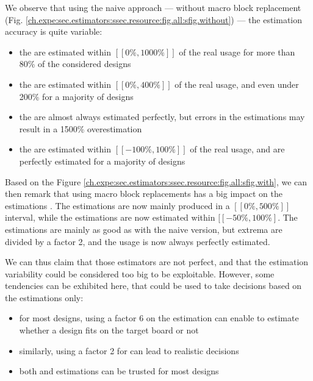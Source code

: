         We observe that using the naive approach --- \ie without macro block replacement (Fig. \ref{ch.expe:sec.estimators:ssec.resource:fig.all:sfig.without}) --- the estimation accuracy is quite variable:
        \begin{itemize}
            \item the  are estimated within $[\![0\%, 1000\%]\!]$ of the real usage for more than 80\% of the considered designs
            \item the  are estimated within $[\![0\%, 400\%]\!]$ of the real usage, and even under 200\% for a majority of designs
            \item the  are almost always estimated perfectly, but errors in the estimations may result in a 1500\% overestimation
            \item the  are estimated within $[\![-100\%, 100\%]\!]$ of the real usage, and are perfectly estimated for a majority of designs
        \end{itemize}

\clearpage
        Based on the Figure \ref{ch.expe:sec.estimators:ssec.resource:fig.all:sfig.with}, we can then remark that using macro block replacements has a big impact on the estimations .
        The  estimations are now mainly produced in a $[\![0\%, 500\%]\!]$ interval, while the  estimations are now estimated within $[\![-50\%, 100\%]$.
        The  estimations are mainly as good as with the naive version, but extrema are divided by a factor 2, and the  usage is now always perfectly estimated.

        We can thus claim that those estimators are not perfect, and that the estimation variability could be considered too big to be exploitable.
        However, some tendencies can be exhibited here, that could be used to take decisions based on the estimations only:
        \begin{itemize}
            \item for most designs, using a factor 6 on the  estimation can enable to estimate whether a design fits on the target board or not
            \item similarly, using a factor 2 for  can lead to realistic decisions
            \item both  and  estimations can be trusted for most designs
        \end{itemize}

